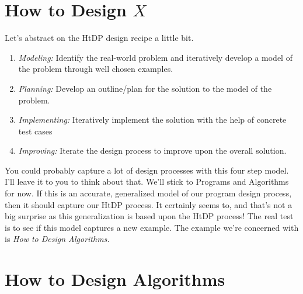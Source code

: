 \documentclass[]{tufte-handout}
\begin{document}
\section{How to Design $X$}

Let's abstract on the HtDP design recipe a little bit.
\begin{enumerate}
\item \textit{Modeling:} Identify the real-world problem and iteratively develop a model of the problem through well chosen examples.
\item \textit{Planning:} Develop an outline/plan for the solution to the model of the problem.
\item \textit{Implementing:} Iteratively implement the solution with the help of concrete test cases
\item \textit{Improving:} Iterate the design process to improve upon the overall solution.
\end{enumerate}

You could probably capture a lot of design processes with this four step model.  I'll leave it to you to think about that. We'll stick to Programs and Algorithms for now.  If this is an accurate, generalized model of our program design process, then it should capture our HtDP process.  It certainly seems to, and that's not a big surprise as this generalization is based upon the HtDP process! The real test is to see if this model captures a new example.  The example we're concerned with is \textit{How to Design Algorithms.} 

\section{How to Design Algorithms}
\end{document}
